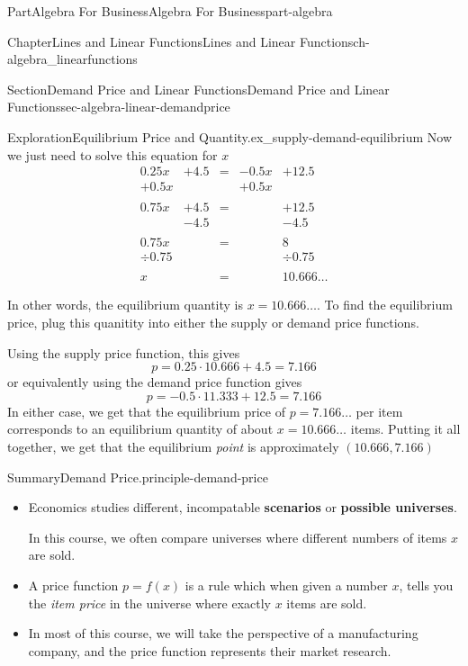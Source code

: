 \documentclass[oneside,10pt,]{tufte-book}
\newcommand{\terminology}[1]{\textbf{#1}}
\numberwithin{equation}{chapter}
\newcommand{\amp}{&}
\begin{document}
\begin{partptx}{Part}{Algebra For Business}{}{Algebra For Business}{}{}{part-algebra}
\begin{chapterptx}{Chapter}{Lines and Linear Functions}{}{Lines and Linear Functions}{}{}{ch-algebra_linearfunctions}
\begin{sectionptx}{Section}{Demand Price and Linear Functions}{}{Demand Price and Linear Functions}{}{}{sec-algebra-linear-demandprice}
\begin{exploration}{Exploration}{Equilibrium Price and Quantity.}{ex_supply-demand-equilibrium}
Now we just need to solve this equation for \(x\)%
\begin{align*}
0.25x \amp+ 4.5\amp = \amp-0.5x \amp+ 12.5 \\
+0.5x \amp     \amp   \amp+0.5x \amp       \\
\amp \amp \amp \amp\\
0.75x \amp+ 4.5\amp = \amp      \amp+ 12.5 \\
\amp- 4.5\amp   \amp      \amp- 4.5  \\
\amp \amp \amp \amp\\
0.75x \amp     \amp = \amp      \amp 8   \\
\div0.75\amp    \amp   \amp      \amp \div 0.75   \\
\amp \amp \amp \amp\\
x \amp         \amp = \amp     \amp 10.666\dots  
\end{align*}
%
\par
In other words, the equilibrium quantity is \(x=10.666\dots\). To find the equilibrium price, plug this quanitity into either the supply or demand price functions.%
\par
Using the supply price function, this gives%
\begin{equation*}
p = 0.25\cdot 10.666 + 4.5 = 7.166
\end{equation*}
or equivalently using the demand price function gives%
\begin{equation*}
p =  -0.5\cdot 11.333 + 12.5 = 7.166
\end{equation*}
In either case, we get that the equilibrium price of \(p=7.166\dots\) \textdollar{} per item corresponds to an equilibrium quantity of about \(x=10.666\dots\) items.  Putting it all together, we get that the equilibrium \emph{point} is approximately \((10.666,7.166)\)%
\end{exploration}%
\begin{assemblage}{Summary}{Demand Price.}{principle-demand-price}%
%
\begin{itemize}[label=\textbullet]
\item{}Economics studies different, incompatable \terminology{scenarios} or \terminology{possible universes}.%
\par
In this course, we often compare universes where different numbers of items \(x\) are sold.%
\item{}A price function \(p = f(x)\) is a rule which when given a number \(x\), tells you the \emph{item price} in the universe where exactly \(x\) items are sold.%
\item{}In most of this course, we will take the perspective of a manufacturing company, and the price function represents their market research.%

\end{itemize}
\end{assemblage}
\end{sectionptx}
\end{chapterptx}
\end{partptx}
\end{document}
